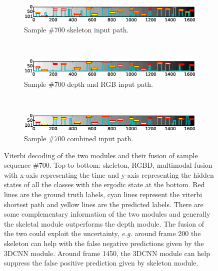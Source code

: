 \begin{figure}[t]
        \centering
        \begin{subfigure}[c]{.8\textwidth}
                \includegraphics[width=\textwidth]{images/path/Sample0700_sk}
                \caption{Sample \#700 skeleton input path.}
                \label{Sample0700_sk}
        \end{subfigure}%
        ~ %

        \begin{subfigure}[c]{0.8\textwidth}
                \includegraphics[width=\textwidth]{images/path/Sample0700_cnn}
                \caption{Sample \#700 depth and RGB input path.}
                \label{Sample0700_cnn}
        \end{subfigure}

        ~ %
        \begin{subfigure}[c]{0.8\textwidth}
                \includegraphics[width=\textwidth]{images/path/Sample0700_combined}
                \caption{Sample \#700 combined input path.}
                \label{Sample0700_combined}
        \end{subfigure}

  \caption{Viterbi decoding of the two modules and their fusion of sample sequence \#700. Top to bottom: skeleton, RGBD, multimodal fusion with x-axis representing the time and y-axis representing the hidden states of all the classes with the ergodic state at the bottom. Red lines are the ground truth labels, cyan lines represent the viterbi shortest path and yellow lines are the predicted labels. There are some complementary information of the two modules and generally the skeletal module outperforms the depth module. The fusion of the two could exploit the uncertainty, \emph{e.g.} around frame 200 the skeleton can help with the false negative predictions given by the 3DCNN module. Around frame 1450, the 3DCNN module can help suppress the false positive prediction given by skeleton module.
  }\label{Sample0700_comparison}
\end{figure}

